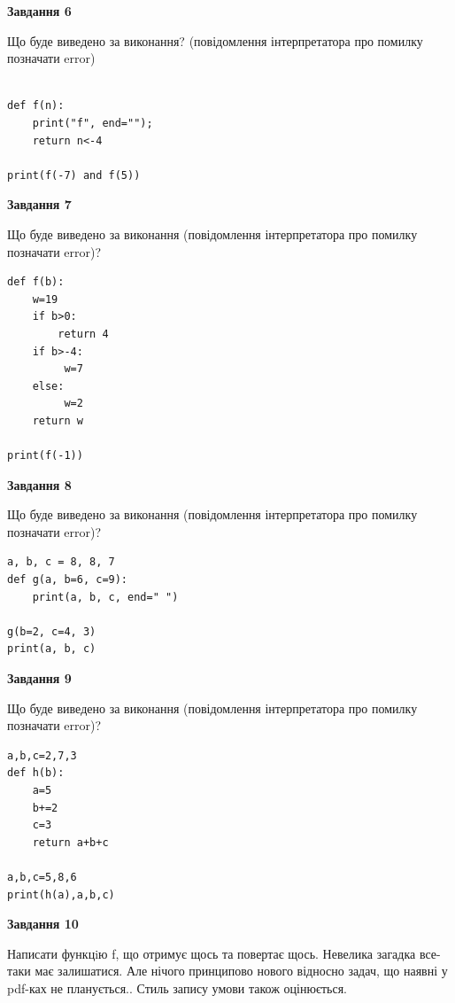 \documentclass[12pt, ukrainian]{article}
\begin{document}
{\begin {large}
{\begin {center}\textbf{Завдання 6}\end {center}}

Що буде виведено за виконання? (повідомлення інтерпретатора про помилку позначати error)\par
\begin{verbatim}

def f(n):
    print("f", end="");
    return n<-4

print(f(-7) and f(5))
\end{verbatim}

{\begin {center}\textbf{Завдання 7}\end {center}}

Що буде виведено за виконання (повідомлення інтерпретатора про помилку позначати error)?\par
\begin{verbatim}
def f(b):
    w=19
    if b>0: 
        return 4
    if b>-4:
         w=7
    else:
         w=2
    return w

print(f(-1))
\end{verbatim}

{\begin {center}\textbf{Завдання 8}\end {center}}

Що буде виведено за виконання (повідомлення інтерпретатора про помилку позначати error)?\par
\begin{verbatim}
a, b, c = 8, 8, 7
def g(a, b=6, c=9):
    print(a, b, c, end=" ")

g(b=2, c=4, 3)
print(a, b, c)
\end{verbatim}

{\begin {center}\textbf{Завдання 9}\end {center}}

Що буде виведено за виконання (повідомлення інтерпретатора про помилку позначати error)?\par
\begin{verbatim}
a,b,c=2,7,3
def h(b):
    a=5
    b+=2
    c=3
    return a+b+c

a,b,c=5,8,6
print(h(a),a,b,c)
\end{verbatim}

{\begin {center}\textbf{Завдання 10}\end {center}}


Написати функцiю f, що отримує щось та повертає щось. Невелика загадка все-таки має залишатися. Але нічого принципово нового відносно задач, що наявні у pdf-ках не планується.. Стиль запису умови також оцінюється.\par
\end {large}}
\newpage
\end{document}
